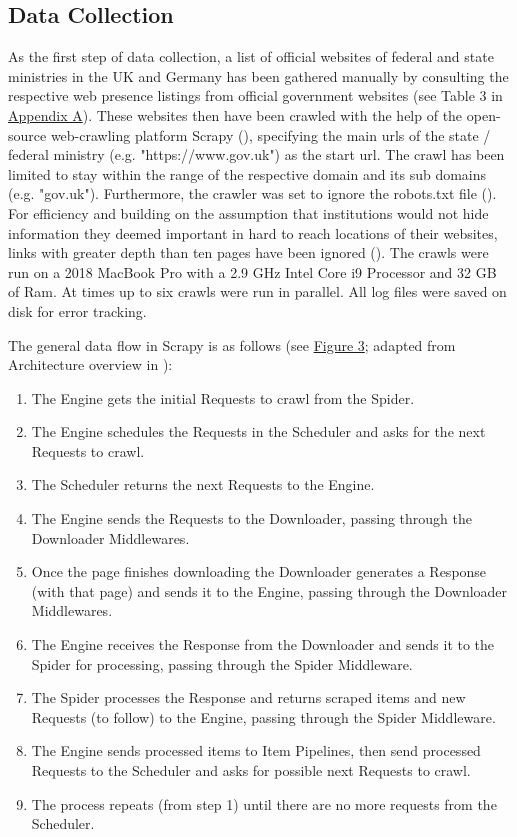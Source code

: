 \subsection{Data Collection}
As the first step of data collection, a list of official websites of federal and state ministries in the UK and Germany has been gathered manually by consulting the respective web presence listings from official government websites (see Table 3 in \hyperref[Appendix A]{Appendix A}). These websites then have been crawled with the help of the open-source web-crawling platform Scrapy (\cite{Kouzis-Loukas2016}), specifying the main urls of the state / federal ministry (e.g. "https://www.gov.uk") as the start url. The crawl has been limited to stay within the range of the respective domain and its sub domains (e.g. "gov.uk"). Furthermore, the crawler was set to ignore the robots.txt file (\cite{Sun2007}). For efficiency and building on the assumption that institutions would not hide information they deemed important in hard to reach locations of their websites, links with greater depth than ten pages have been ignored (\cite{Scrapy2018}). The crawls were run on a 2018 MacBook Pro with a 2.9 GHz Intel Core i9 Processor and 32 GB of Ram. At times up to six crawls were run in parallel. All log files were saved on disk for error tracking.\par
The general data flow in Scrapy is as follows (see \hyperref[fig:Scrapy Architecture]{Figure 3}; adapted from Architecture overview in \cite{Scrapy2018}):
\begin{enumerate}
    \setlength\itemsep{0.001em}
        \item The Engine gets the initial Requests to crawl from the Spider.
        \item The Engine schedules the Requests in the Scheduler and asks for the next Requests to crawl.
        \item The Scheduler returns the next Requests to the Engine.
        \item The Engine sends the Requests to the Downloader, passing through the Downloader Middlewares.
        \item Once the page finishes downloading the Downloader generates a Response (with that page) and sends it to the Engine, passing through the Downloader Middlewares.
        \item The Engine receives the Response from the Downloader and sends it to the Spider for processing, passing through the Spider Middleware.
        \item The Spider processes the Response and returns scraped items and new Requests (to follow) to the Engine, passing through the Spider Middleware.
        \item The Engine sends processed items to Item Pipelines, then send processed Requests to the Scheduler and asks for possible next Requests to crawl.
        \item The process repeats (from step 1) until there are no more requests from the Scheduler.
\end{enumerate}\par 
